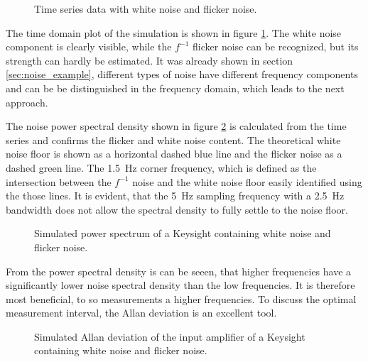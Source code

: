 \begin{figure}[ht]
    \centering
    
    \caption{Time series data with white noise and flicker noise.}
    \label{fig:autozero_raw_time}
\end{figure}

The time domain plot of the simulation is shown in figure \ref{fig:autozero_raw_time}. The white noise component is clearly visible, while the $f^{-1}$ flicker noise can be recognized, but its strength can hardly be estimated. It was already shown in section \ref{sec:noise_example}, different types of noise have different frequency components and can be be distinguished in the frequency domain, which leads to the next approach.

The noise power spectral density shown in figure \ref{fig:autozero_raw_psd} is calculated from the time series and confirms the flicker and white noise content. The theoretical white noise floor is shown as a horizontal dashed blue line and the flicker noise as a dashed green line. The \qty{1.5}{\Hz} corner frequency, which is defined as the intersection between the $f^{-1}$ noise and the white noise floor easily identified using the those lines. It is evident, that the \qty{5}{\Hz} sampling frequency with a \qty{2.5}{\Hz} bandwidth does not allow the spectral density to fully settle to the noise floor.

\begin{figure}[hb]
    \centering
    
    \caption{Simulated power spectrum of a Keysight  containing white noise and flicker noise.}
    \label{fig:autozero_raw_psd}
\end{figure}

From the power spectral density is can be seeen, that higher frequencies have a significantly lower noise spectral density than the low frequencies. It is therefore most beneficial, to so measurements a higher frequencies. To discuss the optimal measurement interval, the Allan deviation is an excellent tool.

\begin{figure}[ht]
    \centering
    
    \caption{Simulated Allan deviation of the input amplifier of a Keysight  containing white noise and flicker noise.}
    \label{fig:autozero_raw_adev}
\end{figure}

